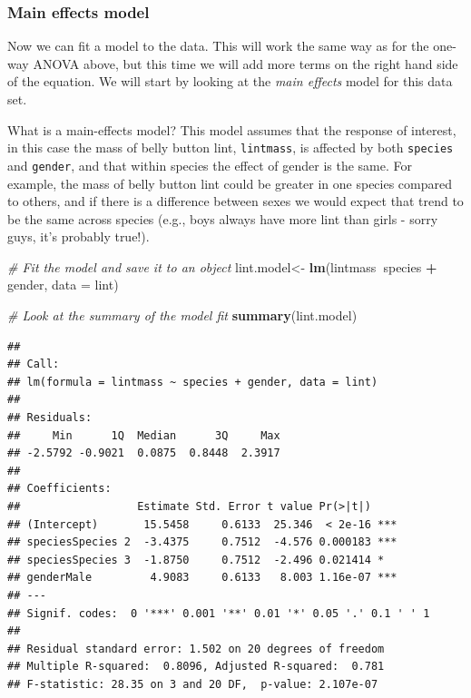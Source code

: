 \documentclass[
]{book}
\newenvironment{Shaded}{\begin{snugshade}}{\end{snugshade}}
\newcommand{\CommentTok}[1]{\textcolor[rgb]{0.56,0.35,0.01}{\textit{#1}}}
\newcommand{\DataTypeTok}[1]{\textcolor[rgb]{0.13,0.29,0.53}{#1}}
\newcommand{\KeywordTok}[1]{\textcolor[rgb]{0.13,0.29,0.53}{\textbf{#1}}}
\newcommand{\NormalTok}[1]{#1}
\newcommand{\OperatorTok}[1]{\textcolor[rgb]{0.81,0.36,0.00}{\textbf{#1}}}
\newcommand{\StringTok}[1]{\textcolor[rgb]{0.31,0.60,0.02}{#1}}
\begin{document}
\hypertarget{main-effects-7}{%
\subsubsection{Main effects model}\label{main-effects-7}}

Now we can fit a model to the data. This will work the same way as for the one-way ANOVA above, but this time we will add more terms on the right hand side of the equation. We will start by looking at the \emph{main effects} model for this data set.

What is a main-effects model? This model assumes that the response of interest, in this case the mass of belly button lint, \texttt{lintmass}, is affected by both \texttt{species} and \texttt{gender}, and that within species the effect of gender is the same. For example, the mass of belly button lint could be greater in one species compared to others, and if there is a difference between sexes we would expect that trend to be the same across species (e.g., boys always have more lint than girls - sorry guys, it's probably true!).

\begin{Shaded}
\begin{Highlighting}[]
\CommentTok{# Fit the model and save it to an object}
\NormalTok{lint.model<-}\StringTok{ }\KeywordTok{lm}\NormalTok{(lintmass}\OperatorTok{~}\NormalTok{species }\OperatorTok{+}\StringTok{ }\NormalTok{gender, }\DataTypeTok{data =}\NormalTok{ lint)}

\CommentTok{# Look at the summary of the model fit}
\KeywordTok{summary}\NormalTok{(lint.model)}
\end{Highlighting}
\end{Shaded}

\begin{verbatim}
## 
## Call:
## lm(formula = lintmass ~ species + gender, data = lint)
## 
## Residuals:
##     Min      1Q  Median      3Q     Max 
## -2.5792 -0.9021  0.0875  0.8448  2.3917 
## 
## Coefficients:
##                  Estimate Std. Error t value Pr(>|t|)    
## (Intercept)       15.5458     0.6133  25.346  < 2e-16 ***
## speciesSpecies 2  -3.4375     0.7512  -4.576 0.000183 ***
## speciesSpecies 3  -1.8750     0.7512  -2.496 0.021414 *  
## genderMale         4.9083     0.6133   8.003 1.16e-07 ***
## ---
## Signif. codes:  0 '***' 0.001 '**' 0.01 '*' 0.05 '.' 0.1 ' ' 1
## 
## Residual standard error: 1.502 on 20 degrees of freedom
## Multiple R-squared:  0.8096,	Adjusted R-squared:  0.781 
## F-statistic: 28.35 on 3 and 20 DF,  p-value: 2.107e-07
\end{verbatim}
\end{document}
